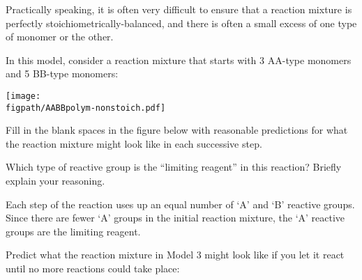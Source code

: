 \begin{activity}
\begin{model}

Practically speaking, it is often very difficult to ensure that a reaction mixture is perfectly stoichiometrically-balanced, and there is often a small excess of one type of monomer or the other.

In this model, consider a reaction mixture that starts with 3 AA-type monomers and 5 BB-type monomers:

\vspace{0.1in}
\centerline{\texttt{[image: \\figpath/AABBpolym-nonstoich.pdf]}}

\end{model}

\begin{ctqs}

		\question Fill in the blank spaces in the figure below with reasonable predictions for what the reaction mixture might look like in each successive step.
		
			\begin{solution}[1in]
			\end{solution}
		
		\clearpage
		\question Which type of reactive group is the ``limiting reagent'' in this reaction?  Briefly explain your reasoning.
		
			\begin{solution}[1in]
				Each step of the reaction uses up an equal number of `A' and `B' reactive groups. Since there are fewer `A' groups in the initial reaction mixture, the `A' reactive groups are the limiting reagent.
			\end{solution}
		
		\question \label{ctq:nonstoichpredict} Predict what the reaction mixture in Model 3 might look like if you let it react until no more reactions could take place:
		
\begin{solution}
\end{solution}
		

\end{ctqs}
\end{activity}
